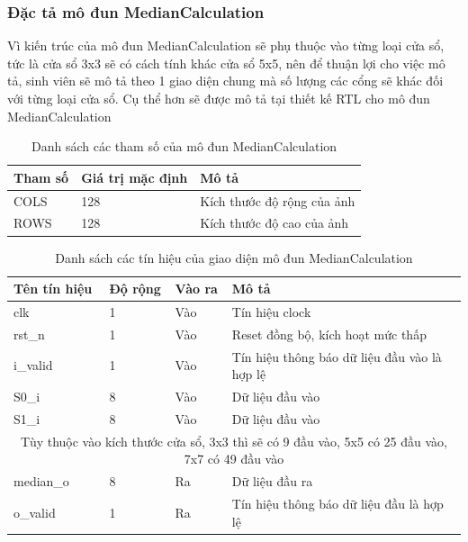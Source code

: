 \subsubsection{Đặc tả mô đun MedianCalculation}
Vì kiến trúc của mô đun MedianCalculation sẽ phụ thuộc vào từng loại cửa sổ, tức là cửa sổ 3x3 sẽ có cách tính khác cửa sổ 5x5, nên để thuận lợi cho việc mô tả, sinh viên sẽ mô tả theo 1 giao diện chung mà số lượng các cổng sẽ khác đối với từng loại cửa sổ. Cụ thể hơn sẽ được mô tả tại thiết kế RTL cho mô đun MedianCalculation
\begin{table}[!ht]
    \centering
    \renewcommand{\arraystretch}{1.3} %
    \begin{tabular}{|p{3cm} p{4cm} p{8cm}|}
        \hline
        \rowcolor{gray!30}
        \textbf{Tham số } & \textbf{Giá trị mặc định}  & \textbf{Mô tả} \\
        \hline
        COLS & 128 & Kích thước độ rộng của ảnh
        \\ \hline
        ROWS & 128 & Kích thước độ cao của ảnh
        \\ \hline
    \end{tabular}
    \caption{Danh sách các tham số của mô đun MedianCalculation}
    \label{tab:paramListMedianCalculation}
\end{table}


\begin{table}[h]
    \centering
    \renewcommand{\arraystretch}{1.3} %
    \begin{tabular}{|p{3cm} p{2cm} p{2cm} p{8cm}|}
        \hline
        \rowcolor{gray!30}
        \textbf{Tên tín hiệu} & \textbf{Độ rộng} & \textbf{Vào ra} & \textbf{Mô tả} \\
        \hline
        clk & 1 & Vào & Tín hiệu clock \\
        \hline
        rst\_n & 1 & Vào & Reset đồng bộ, kích hoạt mức thấp \\
        \hline
        i\_valid & 1 & Vào & Tín hiệu thông báo dữ liệu đầu vào là hợp lệ
        \\ \hline
        S0\_i & 8 & Vào & Dữ liệu đầu vào
        \\ \hline
        S1\_i & 8 & Vào & Dữ liệu đầu vào
        \\
        \hline
        \multicolumn{4}{|c|}{Tùy thuộc vào kích thước cửa sổ, 3x3 thì sẽ có 9 đầu vào, 5x5 có 25 đầu vào, 7x7 có 49 đầu vào}
        \\ \hline
        median\_o & 8 & Ra & Dữ liệu đầu ra
        \\ \hline
        o\_valid & 1& Ra & Tín hiệu thông báo dữ liệu đầu là hợp lệ
        \\ \hline
    \end{tabular}
    \caption{Danh sách các tín hiệu của giao diện mô đun MedianCalculation}
    \label{tab:signalListMedianCalculation}
\end{table}

